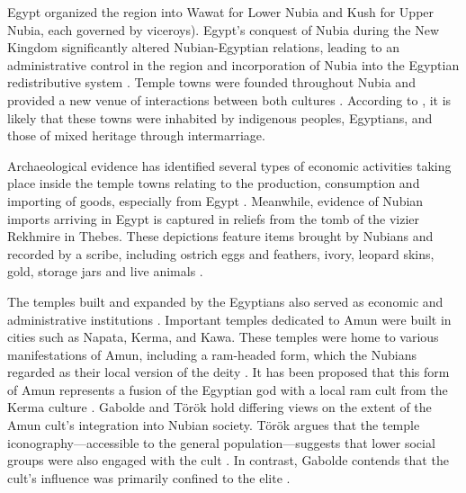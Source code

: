 Egypt organized the region into Wawat for Lower Nubia and Kush for Upper Nubia, each governed by viceroys). Egypt's conquest of Nubia during the New Kingdom significantly altered Nubian-Egyptian relations, leading to an administrative control in the region and incorporation of Nubia into the Egyptian redistributive system \parencites[p.~157]{torokKingdomKushHandbook1997, torokTwoWorldsFrontier2009}{morkotConqueredConquerorOrganization2013}. Temple towns were founded throughout Nubia and provided a new venue of interactions between both cultures \parencites{kempFortifiedTownsNubia1972}{viethNewKingdomTemple2019}. According to \textcite{smithWretchedKushEthnic2003}, it is likely that these towns were inhabited by indigenous peoples, Egyptians, and those of mixed heritage through intermarriage. 

Archaeological evidence has identified several types of economic activities taking place inside the temple towns relating to the production, consumption and importing of goods, especially from Egypt \parencites{roseSesebiCeramicsChronology2017}[p.~343]{spencerBuildingNewGround2017}{cartwrightArchaeobotanicalResearchAmara2017}{taylorCoffinsDebeiraRegional2017}{budkaMaterialRemainsNew2020}. Meanwhile, evidence of Nubian imports arriving in Egypt is captured in reliefs from the tomb of the vizier Rekhmire in Thebes. These depictions feature items brought by Nubians and recorded by a scribe, including ostrich eggs and feathers, ivory, leopard skins, gold, storage jars and live animals \parencites[pl.~XVI]{daviesAncientEgyptianPaintings1936}[p.~XVIII-XX]{daviesTombRekhmiReThebes1943}[p.~301]{meurerNubiansEgyptEarly2020}.

The temples built and expanded by the Egyptians also served as economic and administrative institutions \parencite[p.~209]{torokTwoWorldsFrontier2009}. Important temples dedicated to Amun were built in cities such as Napata, Kerma, and Kawa. These temples were home to various manifestations of Amun, including a ram-headed form, which the Nubians regarded as their local version of the deity \parencite{gaboldeAmunCultIts2020}. It has been proposed that this form of Amun represents a fusion of the Egyptian god with a local ram cult from the Kerma culture \parencites[p.~77]{bonnetKermaRoyaumeNubie1990}{valbelleAmonReKerma2003}[p.~227]{torokTwoWorldsFrontier2009}. Gabolde and Török hold differing views on the extent of the Amun cult's integration into Nubian society. Török argues that the temple iconography—accessible to the general population—suggests that lower social groups were also engaged with the cult \parencite[p.~210]{torokTwoWorldsFrontier2009}. In contrast, Gabolde contends that the cult's influence was primarily confined to the elite \parencite[p.~354]{gaboldeAmunCultIts2020}. 

